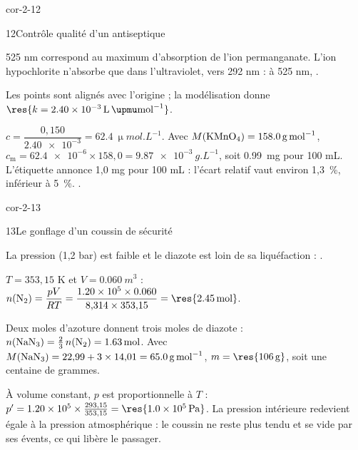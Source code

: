 \begin{blocLivre}{cor-2-12}
\begin{corrige}{12}{Contrôle qualité d'un antiseptique}
\begin{questions}
\item 525 nm correspond au maximum d'absorption de l'ion permanganate. L'ion hypochlorite n'absorbe que dans
l'ultraviolet, vers 292 nm : à 525 nm, .
\item Les points sont alignés avec l'origine ; la modélisation donne $\res{k=\qty{2,40e-3}{L.\upmu mol^{-1}}}$.
\item $c=\dfrac{0{,}150}{\num{2.40e-3}}=\qty{62,4}{\upmu mol.L^{-1}}$. Avec $M(\ce{KMnO4})=\qty{158,0}{g.mol^{-1}}$,
$c_\mathrm{m}=\num{62.4e-6}\times158{,}0=\qty{9,87e-3}{g.L^{-1}}$, soit \qty{0,99}{mg} pour 100 mL.
L'étiquette annonce 1,0 mg pour 100 mL : l'écart relatif vaut environ 1,3~\%, inférieur à 5~\%.
.
\end{questions}
\end{corrige}
\end{blocLivre}
\begin{blocLivre}{cor-2-13}
\begin{corrige}{13}{Le gonflage d'un coussin de sécurité}
\begin{questions}
\item La pression (1,2 bar) est faible et le diazote est loin de sa liquéfaction : .
\item $T=353{,}15$ K et $V=\qty{0,060}{m^3}$ :
$n(\ce{N2})=\dfrac{pV}{RT}=\dfrac{\num{1.20e5}\times\num{0.060}}{8{,}314\times353{,}15}=\res{\qty{2,45}{mol}}$.
\item Deux moles d'azoture donnent trois moles de diazote : $n(\ce{NaN3})=\frac23\,n(\ce{N2})=\qty{1,63}{mol}$.
Avec $M(\ce{NaN3})=22{,}99+3\times14{,}01=\qty{65,0}{g.mol^{-1}}$, $m=\res{\qty{106}{g}}$, soit une centaine de grammes.
\item À volume constant, $p$ est proportionnelle à $T$ : $p'=\num{1.20e5}\times\frac{293{,}15}{353{,}15}=\res{\qty{1,0e5}{Pa}}$.
La pression intérieure redevient égale à la pression atmosphérique : le coussin ne reste plus tendu et se vide
par ses évents, ce qui libère le passager.
\end{questions}
\end{corrige}
\end{blocLivre}
